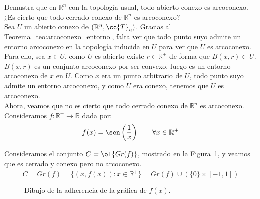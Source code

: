 \begin{ejercicio}
   Demustra que en $\mathbb{R}^n$  con la topología usual, todo abierto conexo es arcoconexo. ¿Es cierto que todo cerrado conexo de $\mathbb{R}^n$ es arcoconexo?\\

   \noindent
   Sea $U$ un abierto conexo de $(\mathbb{R}^n, \cc{T}_u)$. Gracias al Teorema~\ref{teo:arcoconexo_entorno}, falta ver que todo punto suyo admite un entorno arcoconexo en la topología inducida en $U$ para ver que $U$ es arcoconexo. Para ello, sea $x\in U$, como $U$ es abierto existe $r\in \mathbb{R}^+$ de forma que $B(x,r)\subset U$. $B(x,r)$ es un conjunto arcoconexo por ser convexo, luego es un entorno arcoconexo de $x$ en $U$. Como $x$ era un punto arbitrario de $U$, todo punto suyo admite un entorno arcoconexo, y como $U$ era conexo, tenemos que $U$ es arcoconexo.\\

   \noindent
   Ahora, veamos que no es cierto que todo cerrado conexo de $\mathbb{R}^n$ es arcoconexo. Consideramos $f:\mathbb{R}^+\to \mathbb{R}$ dada por:
   \begin{equation*}
       f(x) = \sen\left(\dfrac{1}{x}\right) \qquad \forall x\in \mathbb{R}^+
   \end{equation*}

   Consideramos el conjunto $C=\ol{Gr(f)}$, mostrado en la Figura~\ref{fig:adherencia_sin1x}, y veamos que es cerrado y conexo pero no arcoconexo.
   \begin{equation*}
       C = \overline{Gr(f)} = \overline{\{(x,f(x)) : x\in \mathbb{R}^+\}} = Gr(f) \cup (\{0\}\times [-1,1])
   \end{equation*}
   \begin{figure}
       \centering
        \caption{Dibujo de la adherencia de la gráfica de $f(x)$.}
        \label{fig:adherencia_sin1x}
   \end{figure}


\end{ejercicio}
